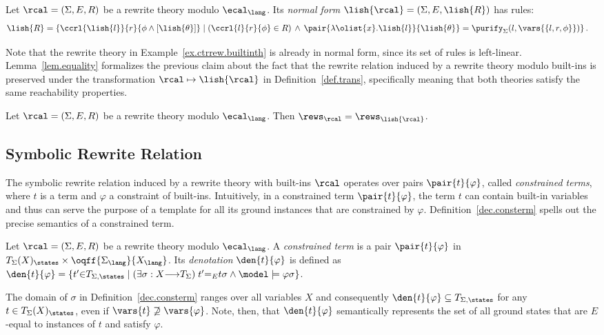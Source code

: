\begin{definition}\label{def.trans}
  Let $\rcal = (\Sigma, E, R)$ be a rewrite theory modulo
  $\ecal_\lang$. Its {\em normal form} $\lish{\rcal} = (\Sigma, E,
  \lish{R})$ has rules:
%
  {\small
  \begin{align*}
    \lish{R} & = \left\{ \ccrl{\lish{l}}{r}{\phi \land [\lish{\theta}]} \mid
    (\ccrl{l}{r}{\phi} \in R) \, \wedge \,  \pair{\lambda
      \olist{x}.\lish{l}}{\lish{\theta}} =
    \purify_\Sigma(l, \vars{\{l,r,\phi\}})\right\}.
  \end{align*}}
\end{definition}
%
Note that the rewrite theory in Example~\ref{ex.ctrrew.builtinth} is
already in normal form, since its set of rules is
left-linear. Lemma~\ref{lem.equality} formalizes the previous claim
about the fact that the rewrite relation induced by a rewrite theory
modulo built-ins is preserved under the transformation $\rcal \mapsto
\lish{\rcal}$ in Definition~\ref{def.trans}, specifically meaning that
both theories satisfy the same reachability properties.

\begin{lemma}\label{lem.equality}
  Let $\rcal = (\Sigma, E, R)$ be a rewrite theory modulo
  $\ecal_\lang$. Then ${\rews_{\rcal}} = {\rews_{\lish{\rcal}}}$.
\end{lemma}

\subsection{Symbolic Rewrite Relation}

The symbolic rewrite relation induced by a rewrite theory with
built-ins $\rcal$ operates over pairs $\pair{t}{\varphi}$, called
\emph{constrained terms}, where $t$ is a term and $\varphi$ a
constraint of built-ins. Intuitively, in a constrained term
$\pair{t}{\varphi}$, the term $t$ can contain built-in variables and
thus can serve the purpose of a template for all its ground instances
that are constrained by $\varphi$. Definition~\ref{dec.consterm}
spells out the precise semantics of a constrained term.

\begin{definition}\label{dec.consterm}
  Let $\rcal = (\Sigma, E, R)$ be a rewrite theory modulo
  $\ecal_\lang$. A {\em constrained term} is a pair
  $\pair{t}{\varphi}$ in $T_{\Sigma}(X)_\states \times
  \oqff{\Sigma_\lang}{X_\lang}$. Its {\em denotation}
  $\den{t}{\varphi}$ is defined as $\den{t}{\varphi} = \{t' {\in}
  T_{\Sigma,\states} \mid (\exists \sigma: X {\longrightarrow}
  T_{\Sigma}) \; t' {=_{E}} t\sigma \land \model \models
  \varphi\sigma \}$.
\end{definition}
%
The domain of $\sigma$ in Definition~\ref{dec.consterm} ranges over
all variables $X$ and consequently $\den{t}{\varphi} \subseteq
T_{\Sigma,\states}$ for any $t \in T_{\Sigma}(X)_\states$, even if
$\vars{t} \not\supseteq \vars{\varphi}$. Note, then, that
$\den{t}{\varphi}$ semantically represents the set of all ground
states that are $E$-equal to instances of $t$ and satisfy $\varphi$.

